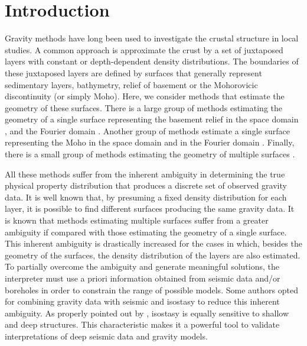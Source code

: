\documentclass[manuscript,revised]{geophysics}
\begin{document}
\section{Introduction}


Gravity methods have long been used to investigate the crustal structure
in local studies.
A common approach is approximate the crust by a set of juxtaposed layers
with constant or depth-dependent density distributions.
The boundaries of these juxtaposed layers are defined by surfaces 
that generally represent sedimentary layers, bathymetry, relief of basement or 
the Mohorovicic discontinuity (or simply Moho).
Here, we consider methods that estimate the geometry of these surfaces.
There is a large group of methods estimating the geometry of a single surface 
representing the basement relief in the space domain
\citep[e.g.,][]{bott1960, tanner1967, cordell-henderson1968, 
barbosa-etal1997, barbosa-etal1999, barbosa-etal1999b, condi-etal1999, silva-etal2006,  
chakravarthi-sundararajan2007, martins-etal2010, silva-etal2010, lima-etal2011, 
martins-etal2011, barnes-barraud2012, silva-etal2014, silva-santos2017},
and the Fourier domain
\citep[e.g.,][]{oldenburg1974, granser1987, reamer-ferguson1989, guspi1993}.
Another group of methods estimate a single surface representing the Moho in 
the space domain 
\citep[e.g.,][]{shin-etal2009, bagherbandi-eshagh2012, barzaghi-biagi2014, 
sampietro2015, uieda-barbosa2017} and in the Fourier domain 
\citep[e.g.,][]{braitenberg-etal1997, braitenberg-zadro1999, vandermeijde-etal2013}.
Finally, there is a small group of methods estimating the geometry of multiple surfaces 
\citep[e.g.,][]{braitenberg-etal2003, camacho-etal2011, salem-etal2014, ferderer-etal2017, 
garcia-abdeslem2017, salem2017}.

All these methods suffer from the inherent ambiguity \citep{skeels1947, roy1962} in
determining the true physical property distribution that produces a discrete set of
observed gravity data. 
It is well known that, by presuming a fixed density distribution for each layer,
it is possible to find different surfaces producing the same gravity data. 
It is known that methods estimating multiple surfaces suffer from a 
greater ambiguity if compared with those estimating the geometry of a single surface.
This inherent ambiguity is drastically increased for the cases in which, besides the
geometry of the surfaces, the density distribution of the layers are also estimated.
To partially overcome the ambiguity and generate meaningful solutions, the interpreter
must use a priori information obtained from seismic data and/or boreholes in
order to constrain the range of possible models.
Some authors opted for combining gravity data with seismic and isostasy 
to reduce this inherent ambiguity.
As properly pointed out by \citet{gradmann-etal2017}, isostasy is equally 
sensitive to shallow and deep structures. This characteristic makes it a
powerful tool to validate interpretations of deep seismic data and gravity models.
\end{document}
